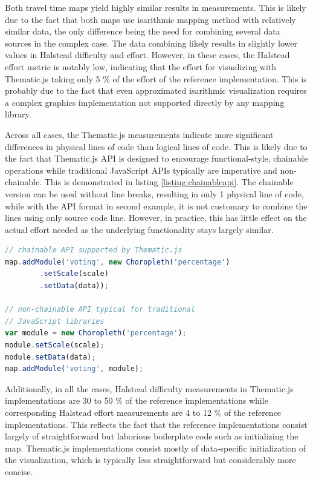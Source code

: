 Both travel time maps yield highly similar results in measurements. This is likely due to the fact that both maps use isarithmic mapping method with relatively similar data, the only difference being the need for combining several data sources in the complex case. The data combining likely results in slightly lower values in Halstead difficulty and effort. However, in these cases, the Halstead effort metric is notably low, indicating that the effort for visualizing with Thematic.js taking only 5 \% of the effort of the reference implementation. This is probably due to the fact that even approximated isarithmic visualization requires a complex graphics implementation not supported directly by any mapping library.

Across all cases, the Thematic.js measurements indicate more significant differences in physical lines of code than logical lines of code. This is likely due to the fact that Thematic.js API is designed to encourage functional-style, chainable operations while traditional JavaScript APIs typically are imperative and non-chainable. This is demonstrated in listing \ref{listing:chainableapi}. The chainable version can be used without line breaks, resulting in only 1 physical line of code, while with the API format in second example, it is not customary to combine the lines using only source code line. However, in practice, this has little effect on the actual effort needed as the underlying functionality stays largely similar.

\begin{lstlisting}[caption=Thematic.js API format. The code has been simplified to increase readability.,language=JavaScript,label=listing:chainableapi]
// chainable API supported by Thematic.js
map.addModule('voting', new Choropleth('percentage')
        .setScale(scale)
        .setData(data));

// non-chainable API typical for traditional
// JavaScript libraries
var module = new Choropleth('percentage');
module.setScale(scale);
module.setData(data);
map.addModule('voting', module);
\end{lstlisting}

Additionally, in all the cases, Halstead difficulty measurements in Thematic.js implementations are 30 to 50 \% of the reference implementations while corresponding Halstead effort measurements are 4 to 12 \% of the reference implementations. This reflects the fact that the reference implementations consist largely of straightforward but laborious boilerplate code such as initializing the map. Thematic.js implementations consist mostly of data-specific initialization of the visualization, which is typically less straightforward but considerably more concise.


